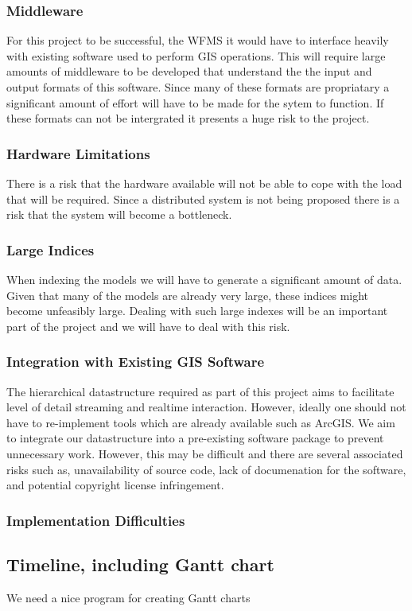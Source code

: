 \documentclass[12pt,a4paper]{article}
\begin{document}
\subsubsection*{Middleware}
For this project to be successful, the WFMS it would have to interface
heavily with existing software used to perform GIS operations. This will
require large amounts of middleware to be developed that understand the
the input and output formats of this software. Since many of these
formats are propriatary a significant amount of effort will have to
be made for the sytem to function. If these formats can not be intergrated
it presents a huge risk to the project.
\subsubsection*{Hardware Limitations}
There is a risk that the hardware available will not be able to cope
with the load that will be required. Since a distributed system is
not being proposed there is a risk that the system will become a bottleneck.
\subsubsection*{Large Indices}
When indexing the models we will have to generate a significant amount of data. Given that many of the models are already very large, these indices might become unfeasibly large. Dealing with such large indexes will be an important part of the project and we will have to deal with this risk.
\subsubsection*{Integration with Existing GIS Software}
The hierarchical datastructure required as part of this project aims to facilitate level of detail streaming and realtime interaction. However, ideally one should not have to re-implement tools which are already available such as ArcGIS. We aim to integrate our datastructure into a pre-existing software package to prevent unnecessary work. However, this may be difficult and there are several associated risks such as, unavailability of source code, lack of documenation for the software, and potential copyright license infringement.
\subsubsection*{Implementation Difficulties}
\subsection{Timeline, including Gantt chart}
We need a nice program for creating Gantt charts
\end{document}
